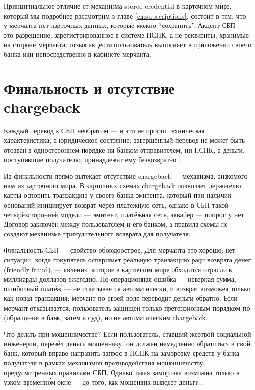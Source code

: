 Принципиальное отличие от механизма stored credential в карточном мире,
который мы подробнее рассмотрим в главе \ref{ch:subscriptions}, состоит
в том, что у мерчанта нет карточных данных, которые можно
\enquote{сохранить}. Акцепт СБП — это разрешение, зарегистрированное
в системе НСПК, а не реквизиты, хранимые на стороне мерчанта; отзыв
акцепта пользователь выполняет в приложении своего банка
или непосредственно в кабинете мерчанта.

\section{Финальность и отсутствие chargeback}
\label{sec:sbp-finality}

Каждый перевод в СБП необратим — и это не просто техническая
характеристика, а юридическое состояние: завершённый перевод не может
быть отозван в одностороннем порядке ни банком-отправителем, ни НСПК,
а деньги, поступившие получателю, принадлежат ему безвозвратно .

Из финальности прямо вытекает отсутствие chargeback — механизма,
знакомого нам из карточного мира. В карточных схемах chargeback позволяет
держателю карты оспорить транзакцию у своего банка-эмитента, который
при наличии оснований инициирует возврат через платёжную сеть, однако
в СБП такой четырёхсторонней модели — эмитент, платёжная сеть,
эквайер — попросту нет. Договор заключён между пользователем
и его банком, а правила схемы не создают механизма принудительного
возврата для получателя.

\begin{kaobox}[title=Важно, colback=red!5, colbacktitle=red!20]
  Финальность СБП — свойство обоюдоострое. Для мерчанта это хорошо:
  нет ситуации, когда покупатель оспаривает реальную транзакцию
  ради возврата денег (friendly fraud), — явления, которое в карточном
  мире обходится отрасли в миллиарды долларов ежегодно. Но операционная
  ошибка — неверная сумма, ошибочный платёж — не откатывается
  автоматически, и возврат возможен только как новая транзакция: мерчант
  по своей воле переводит деньги обратно. Если мерчант отказывается,
  пользователь защищён только претензионным порядком по 
  (обращение в банк, затем в суд), но не автоматическим chargeback.
\end{kaobox}

Что делать при мошенничестве? Если пользователь, ставший жертвой
социальной инженерии, перевёл деньги мошеннику, он должен немедленно
обратиться в свой банк, который вправе направить запрос в НСПК
на заморозку средств у банка-получателя в рамках механизмов
противодействия мошенничеству, предусмотренных правилами СБП. Однако
такая заморозка возможна только в узком временно́м окне — до того,
как мошенник выведет деньги .

